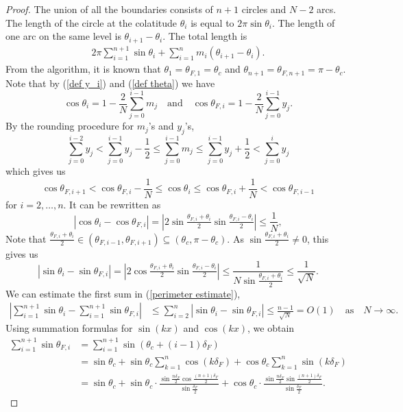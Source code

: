 \documentclass[10pt,a4paper]{amsart}
\begin{document}
\begin{proof}
    The union of all the boundaries consists of $n+1$ circles and $N-2$ arcs. The length of the circle at the colatitude $\theta_i$ is equal to $2\pi\sin\theta_i$. The length of one arc on the same level is $\theta_{i+1}-\theta_i$.
    The total length is 
\begin{align}\label{perimeter estimate}
    2\pi\sum\limits_{i=1}^{n+1}\sin\theta_i+\sum\limits_{i=1}^nm_i(\theta_{i+1}-\theta_i).
\end{align}
From the algorithm, it is known that $\theta_1=\theta_{F,1}=\theta_c$ and  $\theta_{n+1}=\theta_{F,n+1}=\pi-\theta_c$. Note that by (\ref{def y_i})  and (\ref{def theta}) we have 
$$\cos\theta_{i}=1-\frac{2}{N}\sum\limits_{j=0}^{i-1}m_j\quad \text{and} \quad \cos\theta_{F,i}=1-\frac{2}{N}\sum\limits_{j=0}^{i-1}y_j.$$
By the rounding procedure for $m_j$'s and $y_j$'s, 
$$\sum\limits_{j=0}^{i-2}y_j<\sum\limits_{j=0}^{i-1}y_j-\frac{1}{2}\leq \sum\limits_{j=0}^{i-1}m_j\leq \sum\limits_{j=0}^{i-1}y_j+\frac{1}{2}<\sum\limits_{j=0}^{i}y_j$$
which gives us 
$$\cos\theta_{F,i+1}<\cos\theta_{F,i}-\frac{1}{N}\leq \cos\theta_i\leq \cos \theta_{F,i}+\frac{1}{N}<\cos \theta_{F,i-1}$$
for $i=2,\dots ,n.$ It can be rewritten as 
$$|\cos\theta_i-\cos\theta_{F,i}|=\left|2\sin\tfrac{\theta_{F,i}+\theta_i}{2}\sin\tfrac{\theta_{F,i}-\theta_i}{2}\right|\leq \frac{1}{N},$$
Note that $\tfrac{\theta_{F,i}+\theta_i}{2}\in(\theta_{F,i-1},\theta_{F,i+1})\subseteq(\theta_c,\pi -\theta_c)$. As $\sin \tfrac{\theta_{F,i}+\theta_i}{2}\neq 0$, this gives us 
$$|\sin\theta_i-\sin\theta_{F,i}|=\left|2\cos\tfrac{\theta_{F,i}+\theta_i}{2}\sin\tfrac{\theta_{F,i}-\theta_i}{2}\right|\leq \frac{1}{N\sin\tfrac{\theta_{F,i}+\theta_i}{2}}\leq\frac{1}{\sqrt N}.$$
We can estimate the first sum in (\ref{perimeter estimate}),
\begin{align*}
    \left|\sum\limits_{i=1}^{n+1}\sin\theta_i-\sum\limits_{i=1}^{n+1}\sin\theta_{F,i}\right| &\leq \sum\limits_{i=2}^n\left|\sin\theta_i-\sin\theta_{F,i}\right|\leq \frac{n-1}{\sqrt N}=O(1) \quad \text{as}\quad N\rightarrow\infty.
\end{align*}
Using summation formulas for $\sin(kx)$ and $\cos(kx)$, we obtain 
\begin{align*}
    \sum\limits_{i=1}^{n+1}\sin\theta_{F,i}&=\sum\limits_{i=1}^{n+1}\sin(\theta_c+(i-1)\delta_F)\\ &=\sin\theta_c+\sin\theta_c\sum\limits_{k=1}^n \cos (k\delta_F)+\cos\theta_c\sum\limits_{k=1}^n\sin(k\delta_F)
    \\ &= \sin\theta_c+\sin\theta_c\cdot \frac{\sin\frac{n\delta_F}{2}\cos\frac{(n+1)\delta_F}{2}}{\sin\frac{\delta_F}{2}}+\cos\theta_c\cdot \frac{\sin\frac{n\delta_F}{2}\sin\frac{(n+1)\delta_F}{2}}{\sin\frac{\delta_F}{2}}.

\end{align*}
\end{proof}
\end{document}
